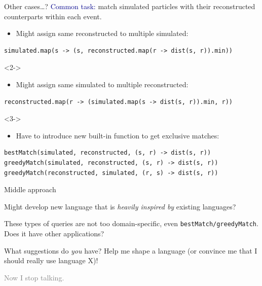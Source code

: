 \documentclass{beamer}
\begin{document}
\begin{frame}[fragile]{Other cases\ldots?}
\vspace{0.5 cm}
\textcolor{darkblue}{Common task:} match simulated particles with their reconstructed counterparts within each event.

\vspace{0.25 cm}
\begin{itemize}
\item Might assign same reconstructed to multiple simulated:
\end{itemize}
\begin{lstlisting}
simulated.map(s -> (s, reconstructed.map(r -> dist(s, r)).min))
\end{lstlisting}

\vspace{0.25 cm}
\begin{uncoverenv}<2->
\begin{itemize}
\item Might assign same simulated to multiple reconstructed:
\end{itemize}
\begin{lstlisting}
reconstructed.map(r -> (simulated.map(s -> dist(s, r)).min, r))
\end{lstlisting}
\end{uncoverenv}

\vspace{0.25 cm}
\begin{uncoverenv}<3->
\begin{itemize}
\item Have to introduce new built-in function to get exclusive matches:
\end{itemize}
\begin{lstlisting}
bestMatch(simulated, reconstructed, (s, r) -> dist(s, r))
greedyMatch(simulated, reconstructed, (s, r) -> dist(s, r))
greedyMatch(reconstructed, simulated, (r, s) -> dist(s, r))
\end{lstlisting}
\end{uncoverenv}
\end{frame}

\begin{frame}{Middle approach}
\vspace{0.5 cm}
\begin{center}
\begin{minipage}{0.91\linewidth}
\begin{center}
Might develop new language that is {\it heavily inspired by} existing languages?

\vspace{1 cm}
These types of queries are not too domain-specific, even {\tt \small bestMatch/greedyMatch}. Does it have other applications?

\vspace{1 cm}
What suggestions do {\it you} have? Help me shape a language (or convince me that I should really use language X)!

\vspace{1 cm}
\textcolor{gray}{Now I stop talking.}
\end{center}
\end{minipage}
\end{center}
\end{frame}
\end{document}
